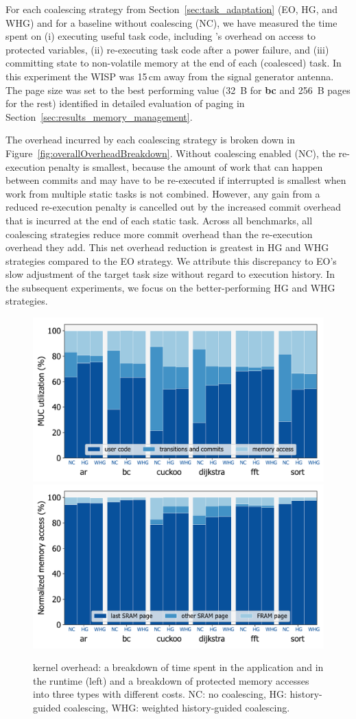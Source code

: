 For each coalescing strategy from Section~\ref{sec:task_adaptation} (EO, HG,
and WHG) and for a baseline without coalescing (NC), we have measured the time
spent on (i) executing useful task code, including \sys's overhead on access to
protected variables, (ii) re-executing task code after a power failure, and
(iii) committing state to non-volatile memory at the end of each (coalesced)
task.  In this experiment the WISP was 15\,cm away from the signal generator
antenna.
%
The page size was set to the best performing value (32~B for \textbf{bc} and
256~B pages for the rest) identified in detailed evaluation of paging in
Section~\ref{sec:results_memory_management}.

The overhead incurred by each coalescing strategy is broken down in
Figure~\ref{fig:overallOverheadBreakdown}. Without coalescing enabled (NC), the
re-execution penalty is smallest, because the amount of work that can happen
between commits and may have to be re-executed if interrupted is smallest when
work from multiple static tasks is not combined.
%
However, any gain from a reduced re-execution penalty is cancelled out by
the increased commit overhead that is incurred at the end of each static
task.
%
Across all benchmarks, all coalescing strategies reduce more commit overhead
than the re-execution overhead they add.
%
This net overhead reduction is greatest in HG and WHG strategies compared
to the EO strategy. We attribute this discrepancy to EO's slow adjustment
of the target task size without regard to execution history.
%
In the subsequent experiments, we focus on the better-performing HG and WHG
strategies.


\begin{figure}
	\centering
	\includegraphics[width=0.49\columnwidth]{figures/overallOverhead}
	\includegraphics[width=0.49\columnwidth]{figures/memAccess}
	\caption{\sys kernel overhead: a breakdown of time spent in
the application and in the runtime (left) and a breakdown of protected memory
accesses into three types with different costs. NC: no coalescing, HG:
history-guided coalescing, WHG: weighted history-guided coalescing.}
	\label{fig:coalEfficiency}
\end{figure}

